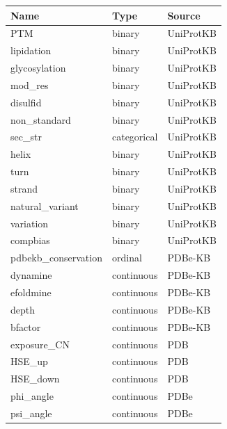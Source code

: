 \begin{table}[]
\centering
\begin{tabular}{@{}lll@{}}
\toprule
Name                 & Type        & Source                \\ \midrule
PTM                  & binary      & UniProtKB             \\
lipidation           & binary      & UniProtKB             \\
glycosylation        & binary      & UniProtKB             \\
mod\_res             & binary      & UniProtKB             \\
disulfid             & binary      & UniProtKB             \\
non\_standard        & binary      & UniProtKB             \\
sec\_str             & categorical & UniProtKB             \\
helix                & binary      & UniProtKB             \\
turn                 & binary      & UniProtKB             \\
strand               & binary      & UniProtKB             \\
natural\_variant     & binary      & UniProtKB             \\
variation            & binary      & UniProtKB             \\
compbias             & binary      & UniProtKB             \\
pdbekb\_conservation & ordinal     & PDBe-KB               \\
dynamine             & continuous  & PDBe-KB               \\
efoldmine            & continuous  & PDBe-KB               \\
depth                & continuous  & PDBe-KB               \\
bfactor              & continuous  & PDBe-KB               \\
exposure\_CN         & continuous  & PDB                   \\
HSE\_up              & continuous  & PDB                   \\
HSE\_down            & continuous  & PDB                   \\
phi\_angle           & continuous  & PDBe                  \\
psi\_angle           & continuous  & PDBe                  \\

\end{tabular}
\end{table}
